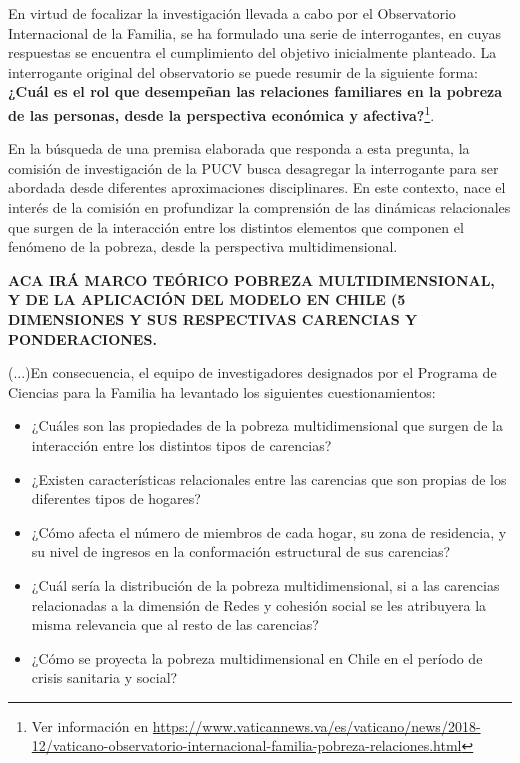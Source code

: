 \documentclass[12pt,letterpaper,spanish]{article}
\begin{document}
En virtud de focalizar la investigación llevada a cabo por el Observatorio Internacional de la Familia, se ha formulado una serie de interrogantes, en cuyas respuestas se encuentra el cumplimiento del objetivo inicialmente planteado. La interrogante original del observatorio se puede resumir de la siguiente forma: \textbf{¿Cuál es el rol que desempeñan las relaciones familiares en la pobreza de las personas, desde la perspectiva económica y afectiva?}\footnote{Ver información en \url{https://www.vaticannews.va/es/vaticano/news/2018-12/vaticano-observatorio-internacional-familia-pobreza-relaciones.html}}. 

En la búsqueda de una premisa elaborada que responda a esta pregunta, la comisión de investigación de la PUCV busca desagregar la interrogante para ser abordada desde diferentes aproximaciones disciplinares.  En este contexto, nace el interés de la comisión en profundizar la comprensión de las dinámicas relacionales que surgen de la interacción entre los distintos elementos que componen el fenómeno de la pobreza, desde la perspectiva multidimensional. 

\textbf{ACA IRÁ MARCO TEÓRICO POBREZA MULTIDIMENSIONAL, Y DE LA APLICACIÓN DEL MODELO EN CHILE (5 DIMENSIONES Y SUS RESPECTIVAS CARENCIAS Y PONDERACIONES.}


(...)En consecuencia, el equipo de investigadores designados por el Programa de Ciencias para la Familia ha levantado los siguientes cuestionamientos:

\begin{itemize}

    \item ¿Cuáles son las propiedades de la pobreza multidimensional que surgen de la interacción entre los distintos tipos de carencias?

    \item ¿Existen características relacionales entre las carencias que son propias de los diferentes tipos de hogares?

    \item ¿Cómo afecta el número de miembros de cada hogar, su zona de residencia, y su nivel de ingresos en la conformación estructural de sus carencias?

    \item ¿Cuál sería la distribución de la pobreza multidimensional, si a las carencias relacionadas a la dimensión de Redes y cohesión social se les atribuyera la misma relevancia que al resto de las carencias?

    \item ¿Cómo se proyecta la pobreza multidimensional en Chile en el período de crisis sanitaria y social?

\end{itemize}
\end{document}
